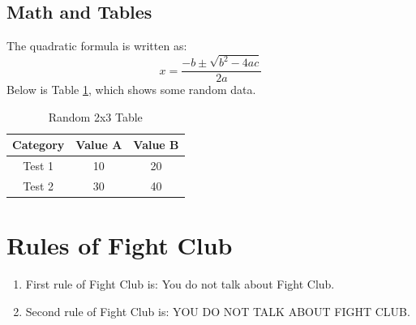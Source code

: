 \documentclass{article}
\begin{document}
\subsection{Math and Tables}
The quadratic formula is written as:
\begin{equation}
    x = \frac{-b \pm \sqrt{b^2 - 4ac}}{2a}
\end{equation}
Below is Table \ref{tab:example}, which shows some random data. \newline

\begin{table}[h]
    \centering
    \begin{tabular}{|c|c|c|}
        \hline
        Category & Value A & Value B \\ \hline
        Test 1 & 10 & 20 \\ \hline
        Test 2 & 30 & 40 \\ \hline
    \end{tabular}
    \caption{Random 2x3 Table}
    \label{tab:example}
\end{table}

\section{Rules of Fight Club}
\begin{enumerate}
    \item First rule of Fight Club is: You do not talk about Fight Club.
    \item Second rule of Fight Club is: YOU DO NOT TALK ABOUT FIGHT CLUB.
\end{enumerate}

\printbibliography
\end{document}
